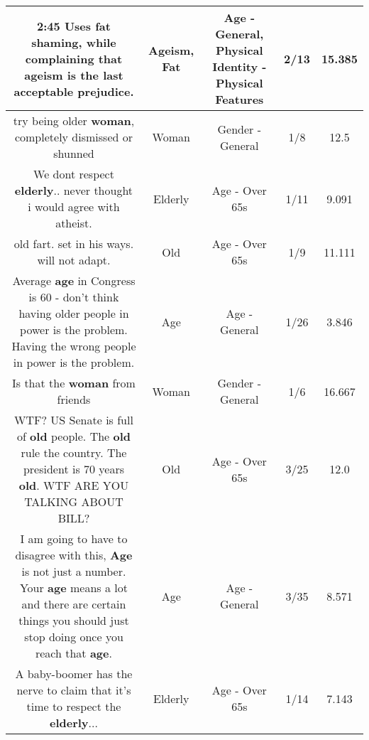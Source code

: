 \documentclass[11pt]{article}
\newlength\mylength
\begin{document}
\begin{center}
\begin{longtable}{|C{.65\mylength}|C{.30\mylength}|C{.12\mylength}|C{.12\mylength}|C{.12\mylength}|}
  \small 2:45 Uses \textbf{fat} shaming, while complaining that \textbf{ageism} is the last acceptable prejudice.\normalsize   & Ageism, Fat & Age - General, Physical Identity - Physical Features & 2/13 & 15.385 \\  \hline
  \small try being older \textbf{woman}, completely dismissed or shunned\normalsize   & Woman & Gender - General & 1/8 & 12.5 \\  \hline
  \small We dont respect \textbf{elderly}.. never thought i would agree with atheist.\normalsize   & Elderly & Age - Over 65s & 1/11 & 9.091 \\  \hline
  \small old fart. set in his ways. will not adapt.\normalsize   & Old & Age - Over 65s & 1/9 & 11.111 \\  \hline
  \small Average \textbf{age} in Congress is 60 - don't think having older people in power is the problem. Having the wrong people in power is the problem.\normalsize   & Age & Age - General & 1/26 & 3.846 \\  \hline
  \small Is that the \textbf{woman} from friends\normalsize   & Woman & Gender - General & 1/6 & 16.667 \\  \hline
  \small WTF? US Senate is full of \textbf{old} people. The \textbf{old} rule the country. The president is 70 years \textbf{old}. WTF ARE YOU TALKING ABOUT BILL?\normalsize   & Old & Age - Over 65s & 3/25 & 12.0 \\  \hline
  \small I am going to have to disagree with this, \textbf{Age} is not just a number. Your \textbf{age} means a lot and there are certain things you should just stop doing once you reach that \textbf{age}.\normalsize   & Age & Age - General & 3/35 & 8.571 \\  \hline
  \small A baby-boomer has the nerve to claim that it's time to respect the \textbf{elderly}...\normalsize   & Elderly & Age - Over 65s & 1/14 & 7.143 \\  \hline

\end{longtable}
\end{center}
\end{document}
